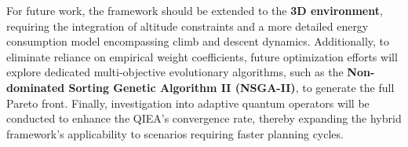 For future work, the framework should be extended to the \textbf{3D environment}, requiring the integration of altitude constraints and a more detailed energy consumption model encompassing climb and descent dynamics. Additionally, to eliminate reliance on empirical weight coefficients, future optimization efforts will explore dedicated multi-objective evolutionary algorithms, such as the \textbf{Non-dominated Sorting Genetic Algorithm II (NSGA-II)}, to generate the full Pareto front. Finally, investigation into adaptive quantum operators will be conducted to enhance the QIEA's convergence rate, thereby expanding the hybrid framework's applicability to scenarios requiring faster planning cycles.




